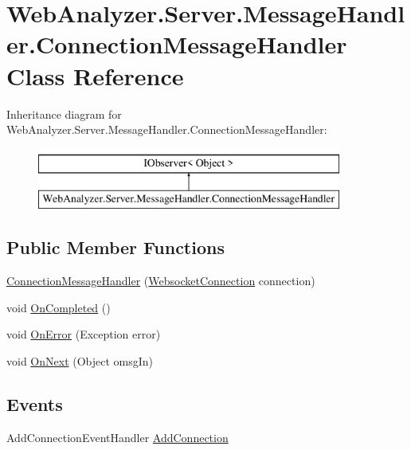 \hypertarget{class_web_analyzer_1_1_server_1_1_message_handler_1_1_connection_message_handler}{}\section{Web\+Analyzer.\+Server.\+Message\+Handler.\+Connection\+Message\+Handler Class Reference}
\label{class_web_analyzer_1_1_server_1_1_message_handler_1_1_connection_message_handler}
Inheritance diagram for Web\+Analyzer.\+Server.\+Message\+Handler.\+Connection\+Message\+Handler\+:\begin{figure}[H]
\begin{center}
\leavevmode
\includegraphics[height=2.000000cm]{class_web_analyzer_1_1_server_1_1_message_handler_1_1_connection_message_handler}
\end{center}
\end{figure}
\subsection*{Public Member Functions}
\begin{DoxyCompactItemize}
\item 
\hyperlink{class_web_analyzer_1_1_server_1_1_message_handler_1_1_connection_message_handler_af2d4c77349a43145f081e572a859952c}{Connection\+Message\+Handler} (\hyperlink{class_web_analyzer_1_1_server_1_1_websocket_connection}{Websocket\+Connection} connection)
\item 
void \hyperlink{class_web_analyzer_1_1_server_1_1_message_handler_1_1_connection_message_handler_aaa544cd527eafff7dff5a3070d4479f4}{On\+Completed} ()
\item 
void \hyperlink{class_web_analyzer_1_1_server_1_1_message_handler_1_1_connection_message_handler_a79ba446b3ba3d69f715d926ce896098d}{On\+Error} (Exception error)
\item 
void \hyperlink{class_web_analyzer_1_1_server_1_1_message_handler_1_1_connection_message_handler_ac6e06ccaa5792fa911bd54d34a166eca}{On\+Next} (Object omsg\+In)
\end{DoxyCompactItemize}
\subsection*{Events}
\begin{DoxyCompactItemize}
\item 
Add\+Connection\+Event\+Handler \hyperlink{class_web_analyzer_1_1_server_1_1_message_handler_1_1_connection_message_handler_a10b402c23b0015efb4b3643a064e7f09}{Add\+Connection}
\end{DoxyCompactItemize}

